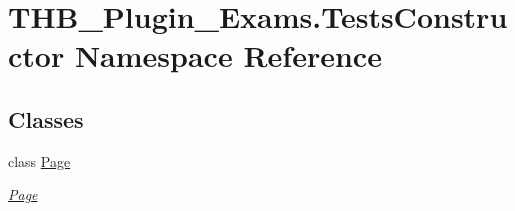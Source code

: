 \hypertarget{namespace_t_h_b___plugin___exams_1_1_tests_constructor}{}\section{T\+H\+B\+\_\+\+Plugin\+\_\+\+Exams.\+Tests\+Constructor Namespace Reference}
\label{namespace_t_h_b___plugin___exams_1_1_tests_constructor}
\subsection*{Classes}
\begin{DoxyCompactItemize}
\item 
class \mbox{\hyperlink{class_t_h_b___plugin___exams_1_1_tests_constructor_1_1_page}{Page}}
\begin{DoxyCompactList}\small\item\em \mbox{\hyperlink{class_t_h_b___plugin___exams_1_1_tests_constructor_1_1_page}{Page}} \end{DoxyCompactList}\end{DoxyCompactItemize}
